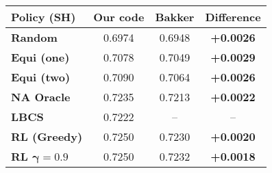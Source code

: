 \begin{tabular}{lccc}
    \toprule
\textbf{Policy (SH)} & \textbf{Our code} & \textbf{Bakker} & \textbf{Difference}\\
\midrule
\textbf{Random} & 0.6974 & 0.6948 & \textbf{+0.0026}\\
\textbf{Equi (one)} & 0.7078 & 0.7049  & \textbf{+0.0029}\\
\textbf{Equi (two)} & 0.7090 & 0.7064  & \textbf{+0.0026}\\
\textbf{NA Oracle} & 0.7235 & 0.7213 & \textbf{+0.0022}\\
\textbf{LBCS} & 0.7222 & --  & --\\
\textbf{RL (Greedy)} & 0.7250 & 0.7230 & \textbf{+0.0020}\\
\textbf{RL $\mathbf{\gamma=0.9}$} & 0.7250 & 0.7232 & \textbf{+0.0018}\\
\bottomrule
\end{tabular}